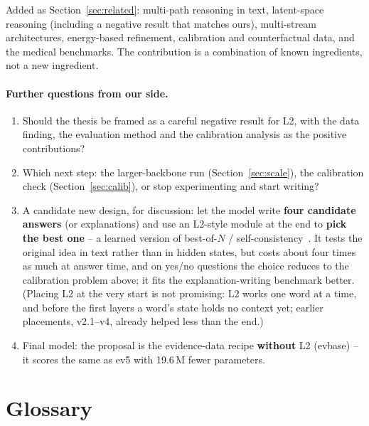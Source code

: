 \documentclass[a4paper,11pt,parskip=half]{scrartcl}
\begin{document}
\begin{rulebox}[title={4. ``Related work is missing.''}]
Added as Section~\ref{sec:related}: multi-path reasoning in text, latent-space reasoning (including a negative result that matches ours), multi-stream architectures, energy-based refinement, calibration and counterfactual data, and the medical benchmarks. The contribution is a combination of known ingredients, not a new ingredient.
\end{rulebox}

\paragraph{Further questions from our side.}
\begin{enumerate}
  \item Should the thesis be framed as a careful negative result for L2, with the data finding, the evaluation method and the calibration analysis as the positive contributions?
  \item Which next step: the larger-backbone run (Section~\ref{sec:scale}), the calibration check (Section~\ref{sec:calib}), or stop experimenting and start writing?
  \item A candidate new design, for discussion: let the model write \textbf{four candidate answers} (or explanations) and use an L2-style module at the end to \textbf{pick the best one} -- a learned version of best-of-$N$ / self-consistency~\cite{wang2023sc}. It tests the original idea in text rather than in hidden states, but costs about four times as much at answer time, and on yes/no questions the choice reduces to the calibration problem above; it fits the explanation-writing benchmark better. (Placing L2 at the very start is not promising: L2 works one word at a time, and before the first layers a word's state holds no context yet; earlier placements, v2.1--v4, already helped less than the end.)
  \item Final model: the proposal is the evidence-data recipe \textbf{without} L2 (evbase) -- it scores the same as ev5 with 19.6\,M fewer parameters.
\end{enumerate}

\appendix
\section{Glossary}
\end{document}
